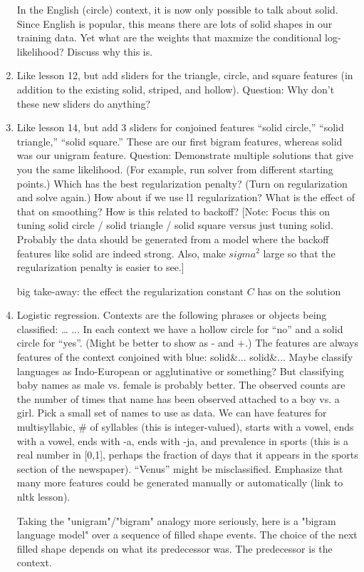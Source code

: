 \documentclass[11pt,letterpaper]{article}
\begin{document}
\begin{enumerate}[resume]
In the English (circle) context, it is now only possible to talk about solid. Since English is popular, this means there are lots of solid shapes in our training data. Yet what are the weights that maxmize the conditional log-likelihood? Discuss why this is.
\item Like lesson 12, but add sliders for the triangle, circle, and square features (in addition to the existing solid, striped, and hollow).  Question: Why don’t these new sliders do anything?
\item Like lesson 14, but add 3 sliders for conjoined features “solid circle,” “solid triangle,” “solid square.”  These are our first bigram features, whereas solid was our unigram feature.  Question: Demonstrate multiple solutions that give you the same likelihood.  (For example, run solver from different starting points.)  Which has the best regularization penalty?   (Turn on regularization and solve again.)  How about if we use l1 regularization?  What is the effect of that on smoothing?  How is this related to backoff?  [Note: Focus this on tuning solid circle / solid triangle / solid square versus just tuning solid.  Probably the data should be generated from a model where the backoff features like solid are indeed strong.  Also, make $sigma^2$ large so that the regularization penalty is easier to see.] 

big take-away: the effect the regularization constant $C$ has on the solution
\item Logistic regression.  Contexts are the following phrases or objects being classified:
…
...
In each context we have a hollow circle for “no” and a solid circle for “yes”.  (Might be better to show as  - and +.)  The features are always features of the context conjoined with blue:
solid\&...
solid\&...
Maybe classify languages as Indo-European or agglutinative or something?  But classifying baby names as male vs. female is probably better.  The observed counts are the number of times that name has been observed attached to a boy vs. a girl.  Pick a small set of names to use as data.  We can have features for multisyllabic, \# of syllables (this is integer-valued), starts with a vowel, ends with a vowel, ends with -a, ends with -ja, and prevalence in sports (this is a real number in [0,1], perhaps the fraction of days that it appears in the sports section of the newspaper).  “Venus” might be misclassified.  Emphasize that many more features could be generated manually or automatically (link to nltk lesson).

Taking the "unigram"/"bigram" analogy more seriously, here is a "bigram language model" over a sequence of filled shape events. The choice of the next filled shape depends on what its predecessor was. The predecessor is the context.


\end{enumerate}
\end{document}
